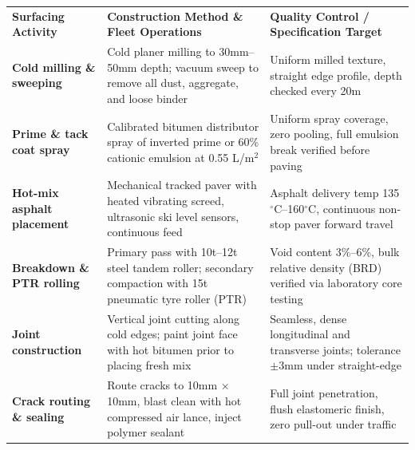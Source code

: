 {\fontsize{7.7pt}{9.8pt}\selectfont
\renewcommand{\arraystretch}{1.23}
\noindent
\begin{tabularx}{\textwidth}{@{}p{3.3cm} p{6.6cm} X@{}}
\rowcolor{mhnavy}
{\color{white}\bfseries Surfacing Activity} & {\color{white}\bfseries Construction Method \& Fleet Operations} & {\color{white}\bfseries Quality Control / Specification Target} \\
\rowcolor{mhbluelight}
\bfseries Cold milling \& sweeping & Cold planer milling to 30mm--50mm depth; vacuum sweep to remove all dust, aggregate, and loose binder & Uniform milled texture, straight edge profile, depth checked every 20m \\
\bfseries Prime \& tack coat spray & Calibrated bitumen distributor spray of inverted prime or 60\% cationic emulsion at 0.55 L/m$^2$ & Uniform spray coverage, zero pooling, full emulsion break verified before paving \\
\rowcolor{mhbluelight}
\bfseries Hot-mix asphalt placement & Mechanical tracked paver with heated vibrating screed, ultrasonic ski level sensors, continuous feed & Asphalt delivery temp 135$^\circ$C--160$^\circ$C, continuous non-stop paver forward travel \\
\bfseries Breakdown \& PTR rolling & Primary pass with 10t--12t steel tandem roller; secondary compaction with 15t pneumatic tyre roller (PTR) & Void content 3\%--6\%, bulk relative density (BRD) verified via laboratory core testing \\
\rowcolor{mhbluelight}
\bfseries Joint construction & Vertical joint cutting along cold edges; paint joint face with hot bitumen prior to placing fresh mix & Seamless, dense longitudinal and transverse joints; tolerance $\pm$3mm under straight-edge \\
\bfseries Crack routing \& sealing & Route cracks to 10mm $\times$ 10mm, blast clean with hot compressed air lance, inject polymer sealant & Full joint penetration, flush elastomeric finish, zero pull-out under traffic \\
\end{tabularx}
\renewcommand{\arraystretch}{1}
}

\vfill

